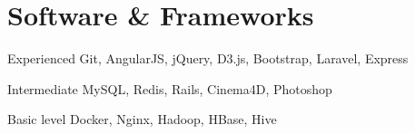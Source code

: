 \documentclass[fontsize=10pt]{tccv}
\begin{document}
\section{Software \& Frameworks}

\begin{factlist}

\item{Experienced}
     {Git, AngularJS, jQuery, D3.js, Bootstrap, Laravel, Express}

\item{Intermediate}
     {MySQL, Redis, Rails, Cinema4D, Photoshop}

\item{Basic level}
     {Docker, Nginx, Hadoop, HBase, Hive}

\end{factlist}

\end{document}
